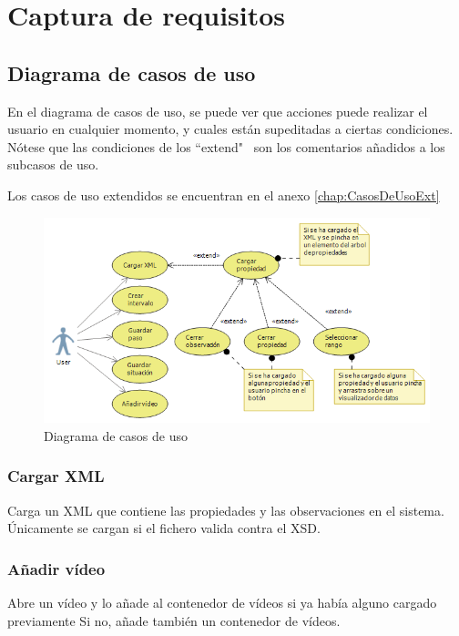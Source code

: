 \chapter{Captura de requisitos}
%

\section{Diagrama de casos de uso}
En el diagrama de casos de uso, se puede ver que acciones puede realizar el usuario en cualquier momento, y cuales
est\'an supeditadas a ciertas condiciones. N\'otese que las condiciones de los ``extend" \ son los comentarios a\~nadidos
a los subcasos de uso.

Los casos de uso extendidos se encuentran en el anexo \ref{chap:CasosDeUsoExt}

\begin{figure}[h]
\centering
\includegraphics[width=1.0\linewidth]{./Figures/useCaseDiagram.png}
\caption[Diagrama de casos de uso]{Diagrama de casos de uso}
\label{fig:useCaseDiagram}
\end{figure}

\subsection{Cargar XML}
Carga un XML que contiene las propiedades y las observaciones en el sistema.
\'Unicamente se cargan si el fichero valida contra el XSD.

\subsection{A\~nadir v\'ideo}
Abre un v\'ideo y lo a\~nade al contenedor de v\'ideos si ya hab\'ia alguno cargado previamente
Si no, a\~nade tambi\'en un contenedor de v\'ideos.

